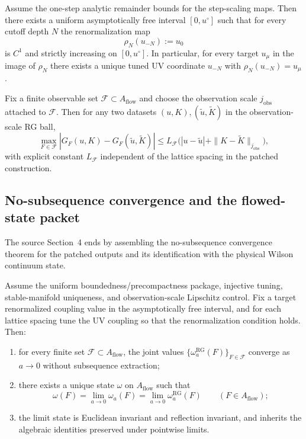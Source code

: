\begin{theorem}
Assume the one-step analytic remainder bounds for the step-scaling maps. Then there exists a uniform asymptotically free interval $[0,u^\circ]$ such that for every cutoff depth $N$ the renormalization map
\[
\rho_N(u_{-N}) := u_0
\]
is $C^1$ and strictly increasing on $[0,u^\circ]$. In particular, for every target $u_\mu$ in the image of $\rho_N$ there exists a unique tuned UV coordinate $u_{-N}$ with $\rho_N(u_{-N})=u_\mu$.
\end{theorem}

\begin{theorem}
Fix a finite observable set $\mathcal F\subset A_{\mathrm{flow}}$ and choose the observation scale $j_{\mathrm{obs}}$ attached to $\mathcal F$. Then for any two datasets $(u,K),(\tilde u,\tilde K)$ in the observation-scale RG ball,
\[
\max_{F\in \mathcal F}|G_F(u,K)-G_F(\tilde u,\tilde K)|
\le L_{\mathcal F}\bigl(|u-\tilde u|+\|K-\tilde K\|_{j_{\mathrm{obs}}}\bigr),
\]
with explicit constant $L_{\mathcal F}$ independent of the lattice spacing in the patched construction.
\end{theorem}

\subsection{No-subsequence convergence and the flowed-state packet}
The source Section~4 ends by assembling the no-subsequence convergence theorem for the patched outputs and its identification with the physical Wilson continuum state.

\begin{theorem}
Assume the uniform boundedness/precompactness package, injective tuning, stable-manifold uniqueness, and observation-scale Lipschitz control. Fix a target renormalized coupling value in the asymptotically free interval, and for each lattice spacing tune the UV coupling so that the renormalization condition holds. Then:
\begin{enumerate}
\item for every finite set $\mathcal F\subset A_{\mathrm{flow}}$, the joint values $\{\omega_a^{\mathrm{RG}}(F)\}_{F\in\mathcal F}$ converge as $a\to 0$ without subsequence extraction;
\item there exists a unique state $\omega$ on $A_{\mathrm{flow}}$ such that
\[
\omega(F)=\lim_{a\to 0}\omega_a(F)=\lim_{a\to 0}\omega_a^{\mathrm{RG}}(F)
\qquad (F\in A_{\mathrm{flow}});
\]
\item the limit state is Euclidean invariant and reflection invariant, and inherits the algebraic identities preserved under pointwise limits.
\end{enumerate}
\end{theorem}

